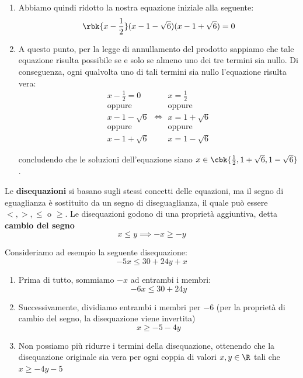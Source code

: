 \documentclass[a4paper, 12pt]{report}
\begin{document}
\begin{enumerate}
        concludendo che $1 + \sqrt{6}$ e $1- \sqrt{6}$ siano le due radici rimanenti

        \item Abbiamo quindi ridotto la nostra equazione iniziale alla seguente:
        \[\rbk{x-\frac{1}{2}} (x-1 - \sqrt{6})(x-1 + \sqrt{6}) = 0\]

        \item A questo punto, per la legge di annullamento del prodotto sappiamo che tale equazione risulta possibile se e solo se almeno uno dei tre termini sia nullo. Di conseguenza, ogni qualvolta uno di tali termini sia nullo l'equazione risulta vera:
        \[\begin{array}{c}
            x-\frac{1}{2} = 0 \\
            \text{oppure} \\
            x-1 - \sqrt{6} \\
            \text{oppure} \\
            x-1 + \sqrt{6}
        \end{array} \iff \begin{array}{c}
            x = \frac{1}{2} \\
            \text{oppure} \\
            x = 1 + \sqrt{6} \\
            \text{oppure} \\
            x = 1 - \sqrt{6}
        \end{array}\]
        
        concludendo che le soluzioni dell'equazione siano $x \in \cbk{\frac{1}{2}, 1 + \sqrt{6}, 1- \sqrt{6}}$.
    \end{enumerate}

    Le \textbf{disequazioni} si basano sugli stessi concetti delle equazioni, ma il segno di eguaglianza è sostituito da un segno di diseguaglianza, il quale può essere $<, >, \leq$ o $\geq$. Le disequazioni godono di una proprietà aggiuntiva, detta \textbf{cambio del segno}
    \[x \leq y \implies -x \geq -y\]
    
    Consideriamo ad esempio la seguente disequazione:
    \[-5x \leq 30 + 24y + x\]

    \begin{enumerate}
        \item Prima di tutto, sommiamo $-x$ ad entrambi i membri:
        \[-6x \leq 30+24y\]
        \item Successivamente, dividiamo entrambi i membri per $-6$ (per la proprietà di cambio del segno, la disequazione viene invertita)
        \[x \geq -5-4y\]
        \item Non possiamo più ridurre i termini della disequazione, ottenendo che la disequazione originale sia vera per ogni coppia di valori $x,y \in \R$ tali che $x \geq -4y-5$
    \end{enumerate}
\end{document}
